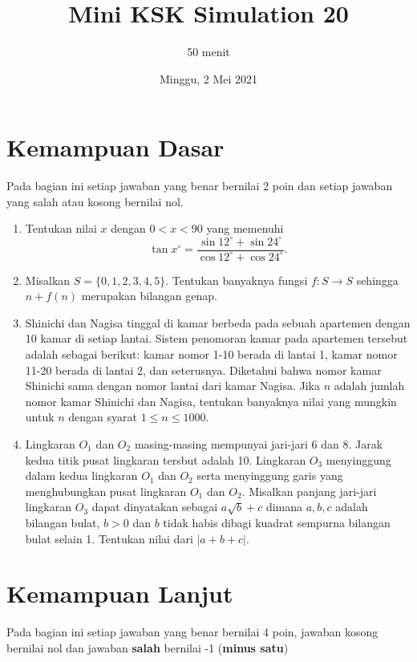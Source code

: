 \documentclass{article}
\title{Mini KSK Simulation 20}
\author{50 menit}
\date{Minggu, 2 Mei 2021}
\begin{document}
	\maketitle
	
	\section{Kemampuan Dasar}
	Pada bagian ini setiap jawaban yang benar bernilai 2 poin dan setiap jawaban yang salah
	atau kosong bernilai nol.
	\begin{enumerate}
		\item Tentukan nilai $x$ dengan $0 < x < 90$ yang memenuhi $$\tan x^\circ = \frac{\sin 12^\circ + \sin 24^\circ}{\cos 12^\circ + \cos 24^\circ}.$$
		
		\item Misalkan $S = \{0,1,2,3,4,5\}.$ Tentukan banyaknya fungsi $f:S\rightarrow S$ sehingga $n+f(n)$ merupakan bilangan genap.
		
		\item Shinichi dan Nagisa tinggal di kamar berbeda pada sebuah apartemen dengan 10 kamar di setiap lantai. Sistem penomoran kamar pada apartemen tersebut adalah sebagai berikut: kamar nomor 1-10 berada di lantai 1, kamar nomor 11-20 berada di lantai 2, dan seterusnya. Diketahui bahwa nomor kamar Shinichi sama dengan nomor lantai dari kamar Nagisa. Jika $n$ adalah jumlah nomor kamar Shinichi dan Nagisa, tentukan banyaknya nilai yang mungkin untuk $n$ dengan syarat $1 \le n \le 1000.$
		
		\item Lingkaran $O_1$ dan $O_2$ masing-masing mempunyai jari-jari 6 dan 8. Jarak kedua titik pusat lingkaran tersbut adalah 10. Lingkaran $O_3$ menyinggung dalam kedua lingkaran $O_1$ dan $O_2$ serta menyinggung garis yang menghubungkan pusat lingkaran $O_1$ dan $O_2$. Misalkan panjang jari-jari lingkaran $O_3$ dapat dinyatakan sebagai $a\sqrt{b}+c$ dimana $a,b,c$ adalah bilangan bulat, $b>0$ dan $b$ tidak habis dibagi kuadrat sempurna bilangan bulat selain 1. Tentukan nilai dari $|a+b+c|$.
		\newpage
	\end{enumerate}

\section{Kemampuan Lanjut}
Pada bagian ini setiap jawaban yang benar bernilai 4 poin, jawaban kosong bernilai nol
dan jawaban \textbf{salah} bernilai -1 (\textbf{minus satu})
\end{document}
